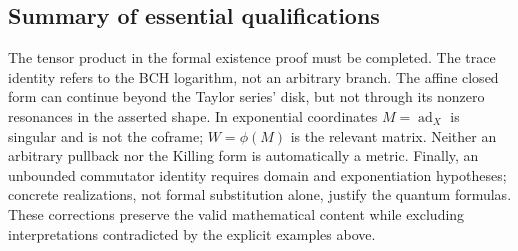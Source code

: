\documentclass[11pt]{article}
\theoremstyle{definition}
\theoremstyle{remark}
\newcommand{\ad}{\operatorname{ad}}
\numberwithin{equation}{section}
\begin{document}
\subsection*{Summary of essential qualifications}
The tensor product in the formal existence proof must be completed. The trace identity refers to the BCH logarithm, not an arbitrary branch. The affine closed form can continue beyond the Taylor series' disk, but not through its nonzero resonances in the asserted shape. In exponential coordinates $M=\ad_X$ is singular and is not the coframe; $W=\phi(M)$ is the relevant matrix. Neither an arbitrary pullback nor the Killing form is automatically a metric. Finally, an unbounded commutator identity requires domain and exponentiation hypotheses; concrete realizations, not formal substitution alone, justify the quantum formulas. These corrections preserve the valid mathematical content while excluding interpretations contradicted by the explicit examples above.
\end{document}
